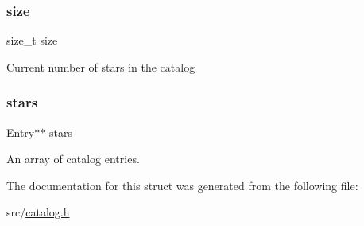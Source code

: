 \subsubsection{\texorpdfstring{size}{size}}
{\footnotesize\ttfamily size\+\_\+t size}

Current number of stars in the catalog \mbox{\label{structcatalog__struct_ae9a5d6bc40976d00eef67a78d939d3d3}} 
\subsubsection{\texorpdfstring{stars}{stars}}
{\footnotesize\ttfamily \mbox{\hyperlink{catalog_8h_aa67e826d3ce187b06707d407683af813}{Entry}}$\ast$$\ast$ stars}

An array of catalog entries. 

The documentation for this struct was generated from the following file\+:\begin{DoxyCompactItemize}
\item 
src/\mbox{\hyperlink{catalog_8h}{catalog.\+h}}\end{DoxyCompactItemize}
